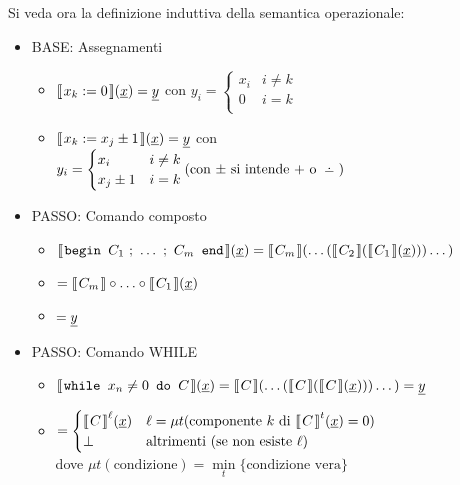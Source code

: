Si veda ora la definizione induttiva della semantica operazionale:
\begin{itemize}
    \item BASE: Assegnamenti
        \begin{itemize}
            \item $\opsemWHILE{x_k:=0}{\sottolinea{x}} = \sottolinea{y}$ con
                $y_i = \begin{cases}
                    x_i & i\neq k\\
                    0 & i= k\\
                \end{cases}$
            \item $\opsemWHILE{x_k:=x_j \pm 1}{\sottolinea{x}} = \sottolinea{y}$ con
                $y_i = \begin{cases}
                    x_i & i\neq k\\
                    x_j\pm 1 & i= k\\
                \end{cases} \hfill \text{(con $\pm$ si intende $+$ o $\dotminus$)}$
        \end{itemize}
    \item PASSO: Comando composto
        \begin{itemize}
            \item $
                \opsemWHILE{\textbegin C_1 \ ; \ \dots \ ; \ C_m\textend}{\sottolinea{x}}
                = \opsemWHILE{C_m}{
                    \dots(
                        \opsemWHILE{C_2}{
                            \opsemWHILE{C_1}{\sottolinea{x}}
                        }
                    )\dots
                }$
            \item[]\hspace{14.1em}$=\opsemWHILEnoP{C_m}\circ\hdots\circ\opsemWHILEnoP{C_1}(\sottolinea{x})$
            \item[]\hspace{14.1em}$=\text{\underline{$y$}}$
        \end{itemize}
    \item PASSO: Comando WHILE
        \begin{itemize}
            \item $
            \opsemWHILE{\while{x_n} C}{\sottolinea{x}} =
            \opsemWHILE{C}{
                \dots(
                \opsemWHILE{C}{
                    \opsemWHILE{C}{\sottolinea{x}}
                })
                \dots
            }=\sottolinea{y}
            $
            \item[]\hspace{11.7em}$=
                \begin{cases}
                    \opsemWHILEnoP{C}^\ell(\sottolinea{x}) & \ell=
                    \mu t(\text{componente $k$ di $\opsemWHILEnoP{C}^t(\sottolinea{x})=0$})\\
                    \perp & \text{altrimenti (se non esiste $\ell)$}
                \end{cases}
            $
            \\[.6em]dove $\mu t (\text{condizione}) = \underset{t}{\min}\{\text{condizione vera\}}$
        \end{itemize}
\end{itemize}
